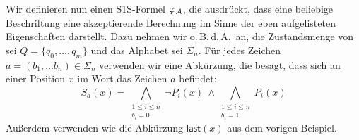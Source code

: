 \documentclass[fontsize=11pt, twoside=false, numbers=autoenddot]{scrbook}
\begin{document}
\begin{beweis}
  \par\medskip\noindent
  Wir definieren nun einen S1S-Formel $\varphi_\mathcal{A}$, die ausdrückt,
  dass eine beliebige Beschriftung eine akzeptierende Berechnung 
  im Sinne der eben aufgelisteten Eigenschaften
  darstellt. Dazu nehmen wir o.\,B.\,d.\,A.\ an, die Zustandsmenge von \Amc
  sei $Q = \{q_0,\dots,q_m\}$ und das Alphabet sei $\Sigma_n$.
  Für jedes Zeichen $a = (b_1,\dots b_n) \in \Sigma_n$
  verwenden wir eine Abkürzung, die besagt, dass sich an einer Position $x$
  im Wort das Zeichen $a$ befindet:
  \[
    S_a(x) = \bigwedge_{\substack{1 \leq i \leq n\\[1pt] b_i = 0}}\!\! \lnot P_i(x)  ~\land
             \bigwedge_{\substack{1 \leq i \leq n\\[1pt] b_i = 1}}\!\! P_i(x)
  \]
  Außerdem verwenden wie die Abkürzung $\textsf{last}(x)$ aus dem vorigen Beispiel.


\end{beweis}
\end{document}
